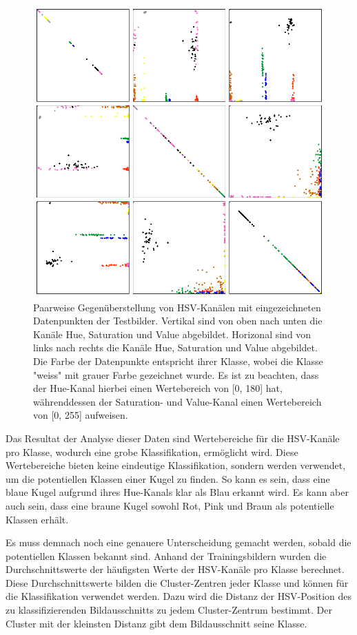 \begin{figure}[h!]
    \begin{center}
        \includegraphics[width=0.7\linewidth]{../common/03_billiard_ai/resources/classification/Cluster_all.png}
    \end{center}
    \caption{
        Paarweise Gegenüberstellung von HSV-Kanälen mit eingezeichneten Datenpunkten der Testbilder.
        Vertikal sind von oben nach unten die Kanäle Hue, Saturation und Value abgebildet.
        Horizonal sind von links nach rechts die Kanäle Hue, Saturation und Value abgebildet.
        Die Farbe der Datenpunkte entspricht ihrer Klasse, wobei die Klasse "weiss" mit grauer Farbe gezeichnet wurde.
        Es ist zu beachten, dass der Hue-Kanal hierbei einen Wertebereich von [0, 180] hat, währenddessen
        der Saturation- und Value-Kanal einen Wertebereich von [0, 255] aufweisen.
    }
    \label{fig:klassifikation_cluster}
\end{figure}

Das Resultat der Analyse dieser Daten sind Wertebereiche für die HSV-Kanäle pro Klasse, wodurch eine grobe Klassifikation,
ermöglicht wird.
Diese Wertebereiche bieten keine eindeutige Klassifikation, sondern werden verwendet, um die potentiellen
Klassen einer Kugel zu finden.
So kann es sein, dass eine blaue Kugel aufgrund ihres Hue-Kanals klar als Blau erkannt wird.
Es kann aber auch sein, dass eine braune Kugel sowohl Rot, Pink und Braun als potentielle Klassen erhält.

Es muss demnach noch eine genauere Unterscheidung gemacht werden, sobald die potentiellen Klassen bekannt sind.
Anhand der Trainingsbildern wurden die Durchschnittswerte der häufigsten Werte der HSV-Kanäle pro Klasse berechnet.
Diese Durchschnittswerte bilden die Cluster-Zentren jeder Klasse und können für die Klassifikation verwendet werden.
Dazu wird die Distanz der HSV-Position des zu klassifizierenden Bildausschnitts zu jedem Cluster-Zentrum bestimmt.
Der Cluster mit der kleinsten Distanz gibt dem Bildausschnitt seine Klasse.

